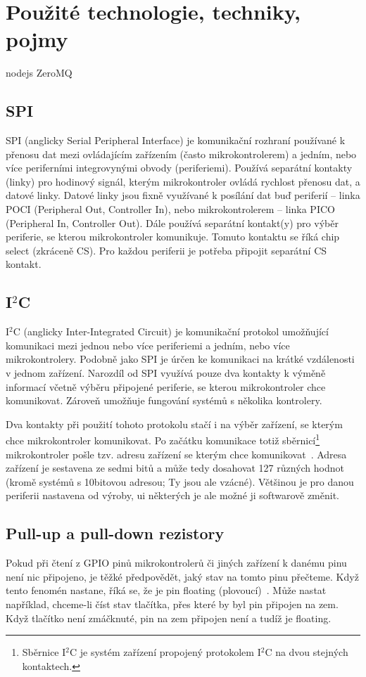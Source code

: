 \chapter{Použité technologie, techniky, pojmy}
nodejs
ZeroMQ

\section{SPI}\label{sec:spi}
SPI (anglicky Serial Peripheral Interface) je komunikační rozhraní používané k přenosu dat mezi ovládajícím zařízením (často mikrokontrolerem) a jedním, nebo více periferními integrovynými obvody (periferiemi).
Používá separátní kontakty (linky) pro hodinový signál, kterým mikrokontroler ovládá rychlost přenosu dat, a datové linky.
Datové linky jsou fixně využívané k posílání dat buď periferií -- linka POCI (Peripheral Out, Controller In), nebo mikrokontrolerem -- linka PICO (Peripheral In, Controller Out).
Dále používá separátní kontakt(y) pro výběr periferie, se kterou mikrokontroler komunikuje. Tomuto kontaktu se říká chip select (zkráceně CS). Pro každou periferii je potřeba připojit separátní CS kontakt.~\cite{sparkfun-spi}

\section{I$^{2}$C}
I$^{2}$C (anglicky Inter-Integrated Circuit) je komunikační protokol umožňující komunikaci mezi jednou nebo více periferiemi a jedním, nebo více mikrokontrolery.
Podobně jako SPI je úrčen ke komunikaci na krátké vzdálenosti v jednom zařízení.
Narozdíl od SPI využívá pouze dva kontakty k výměně informací včetně výběru připojené periferie, se kterou mikrokontroler chce komunikovat.
Zároveň umožňuje fungování systémů s několika kontrolery.~\cite{sparkfun-i2c}

Dva kontakty při použití tohoto protokolu stačí i na výběr zařízení, se kterým chce mikrokontroler komunikovat.
Po začátku komunikace totiž sběrnicí\footnote{Sběrnice I$^{2}$C je systém zařízení propojený protokolem I$^{2}$C na dvou stejných kontaktech.} mikrokontroler pošle tzv. adresu zařízení se kterým chce komunikovat~\cite{sparkfun-i2c}.
Adresa zařízení je sestavena ze sedmi bitů a může tedy dosahovat 127 různých hodnot (kromě systémů s 10bitovou adresou; Ty jsou ale vzácné).
Většinou je pro danou periferii nastavena od výroby, ui některých je ale možné ji softwarově změnit.

\section{Pull-up a pull-down rezistory}
Pokud při čtení z GPIO pinů mikrokontrolerů či jiných zařízení k danému pinu není nic připojeno, je těžké předpovědět, jaký stav na tomto pinu přečteme.
Když tento fenomén nastane, říká se, že je pin floating (plovoucí)~\cite{sparkfun-pud}.
Může nastat například, chceme-li číst stav tlačítka, přes které by byl pin připojen na zem. Když tlačítko není zmáčknuté, pin na zem připojen není a tudíž je floating.

